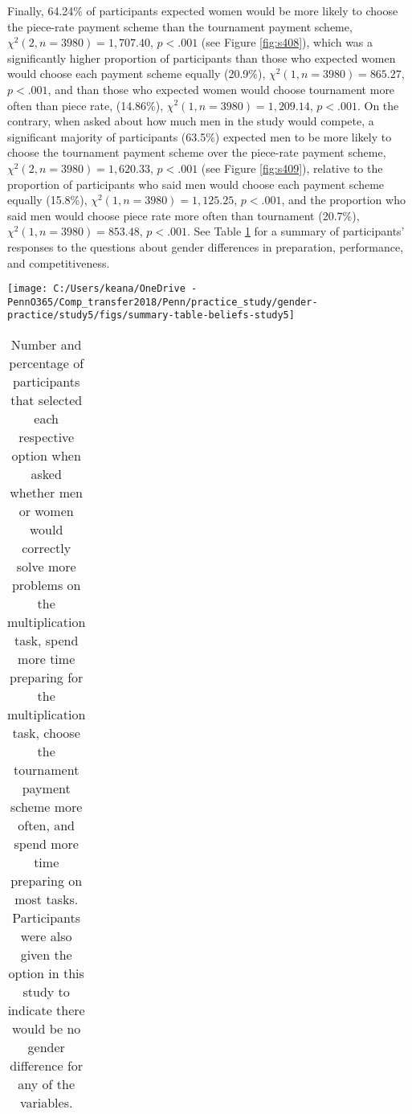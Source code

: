 \documentclass[letterpaper, nobind]{templates/ociamthesis}
\begin{document}
Finally, 64.24\% of participants expected women would be more likely to choose the piece-rate payment scheme than the tournament payment scheme, \(\chi^2(2, n = 3980) = 1,707.40\), \(p < .001\) (see Figure \ref{fig:s408}), which was a significantly higher proportion of participants than those who expected women would choose each payment scheme equally (20.9\%), \(\chi^2(1, n = 3980) = 865.27\), \(p < .001\), and than those who expected women would choose tournament more often than piece rate, (14.86\%), \(\chi^2(1, n = 3980) = 1,209.14\), \(p < .001\). On the contrary, when asked about how much men in the study would compete, a significant majority of participants (63.5\%) expected men to be more likely to choose the tournament payment scheme over the piece-rate payment scheme, \(\chi^2(2, n = 3980) = 1,620.33\), \(p < .001\) (see Figure \ref{fig:s409}), relative to the proportion of participants who said men would choose each payment scheme equally (15.8\%), \(\chi^2(1, n = 3980) = 1,125.25\), \(p < .001\), and the proportion who said men would choose piece rate more often than tournament (20.7\%), \(\chi^2(1, n = 3980) = 853.48\), \(p < .001\). See Table \ref{tab:summary-table-beliefs-study5} for a summary of participants' responses to the questions about gender differences in preparation, performance, and competitiveness.

\newpage

\begin{center}\texttt{[image: C:/Users/keana/OneDrive - PennO365/Comp\_transfer2018/Penn/practice\_study/gender-practice/study5/figs/summary-table-beliefs-study5]} \end{center}

\begin{table}[ht]
\centering
\begingroup\fontsize{0.1pt}{0.1pt}\selectfont
\begin{tabular}{r}
   \\ 
 \end{tabular}
\endgroup
\caption{Number and percentage of participants that selected each respective option when asked whether men or women would correctly solve more problems on the multiplication task, spend more time preparing for the multiplication task, choose the tournament payment scheme more often, and spend more time preparing on most tasks. Participants were also given the option in this study to indicate there would be no gender difference for any of the variables.} 
\label{tab:summary-table-beliefs-study5}
\end{table}
\end{document}
